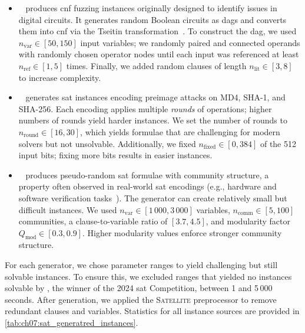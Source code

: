 \begin{itemize}
	\item {}~\citep{BruEtAl10} produces \gls{cnf} fuzzing instances originally designed to identify issues in digital circuits. It generates random Boolean circuits as \glspl{dag} and converts them into \gls{cnf} via the Tseitin transformation~\citep{Tseitin83}. To construct the \gls{dag}, we used $n_{\mathrm{var}}\in[50,150]$ input variables; we randomly paired and connected operands with randomly chosen operator nodes until each input was referenced at least $n_{\mathrm{ref}}\in[1,5]$ times. Finally, we added random clauses of length $n_{\mathrm{lit}}\in[3,8]$ to increase complexity.

	\item {}~\citep{NejEtAl17,AlaEtAl24} generates \gls{sat} instances encoding preimage attacks on MD4, SHA-1, and SHA-256. Each encoding applies multiple \emph{rounds} of operations; higher numbers of rounds yield harder instances. We set the number of rounds to $n_{\mathrm{round}}\in[16,30]$, which yields formulae that are challenging for modern solvers but not unsolvable. Additionally, we fixed $n_{\mathrm{fixed}}\in[0,384]$ of the 512 input bits; fixing more bits results in easier instances.

	\item {}~\citep{GirLev16} produces pseudo-random \gls{sat} formulae with community structure, a property often observed in real-world \gls{sat} encodings (e.g., hardware and software verification tasks~\citep{AnsEtAl12}). The generator can create relatively small but difficult instances. We used $n_{\mathrm{var}}\in[1\,000,3\,000]$ variables, $n_{\mathrm{comm}}\in[5,100]$ communities, a clause-to-variable ratio of $[3{.}7, 4{.}5]$, and modularity factor $Q_{\mathrm{mod}}\in[0{.}3,0{.}9]$. Higher modularity values enforce stronger community structure.
\end{itemize}

For each generator, we chose parameter ranges to yield challenging but still solvable instances.  To ensure this, we excluded ranges that yielded no instances solvable by , the winner of the 2024 \gls{sat} Competition, between 1 and 5\,000 seconds. After generation, we applied the \textsc{Satellite} preprocessor to remove redundant clauses and variables. Statistics for all instance sources are provided in \cref{tab:ch07:sat_generatred_instances}.


